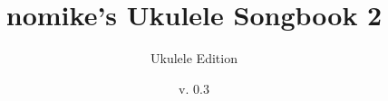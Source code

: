 \documentclass{article}
\newcommand{\titlepicture}[2][]{%
  \renewcommand\placetitlepicture{%
    \texttt{[image: \#2]}\par\medskip
  }%
}
\newcommand{\placetitlepicture}{} %
\begin{document}
\Huge
\title{nomike's Ukulele Songbook 2}
\author{Ukulele Edition}
\date{v. 0.3}
\titlepicture[width=6in]{ukulele}

\maketitle
\end{document}
